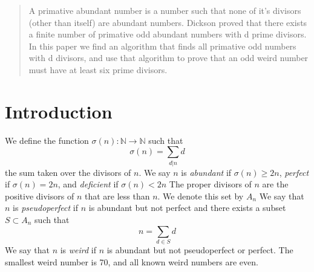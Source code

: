 \documentclass[../paper.tex]{article}
\begin{document}
\begin{abstract}
A primative abundant number is a number such that none of it's 
divisors (other than itself) are abundant numbers. Dickson proved
that there exists a finite number of primative odd abundant 
numbers with d prime divisors. In this paper we find an algorithm 
that finds all primative odd numbers with d divisors, and use that
algorithm to prove that an odd weird number must have at least six 
prime divisors.

\end{abstract}

\section{Introduction}
We define the function 
%
$\sigma(n):\mathbb{N} \rightarrow \mathbb{N}$
%
such that
%
$$\sigma(n) = \sum_{d|n}d$$
%
the sum taken over the divisors of $n$. We say $n$ is 
\textit{abundant} if $\sigma(n) \geq 2n$, \textit{perfect} if 
$\sigma(n) = 2n$, and \textit{deficient} if $\sigma(n) < 2n$ The 
proper divisors of $n$ are the positive divisors of $n$ that are
less than $n$. We denote this set by $\textit{A}_{n}$
%
We say that $n$ is \textit{pseudoperfect} if $n$ is abundant 
but not perfect and there exists a subset 
$ S \subset \textit{A}_{n}$ such that
%
$$ n = \sum_{d \in S} d$$
%
We say that $n$ is \textit{weird} if $n$ is abundant but not 
pseudoperfect or perfect. The smallest weird number is 70, and 
all known weird numbers are even.
\end{document}
